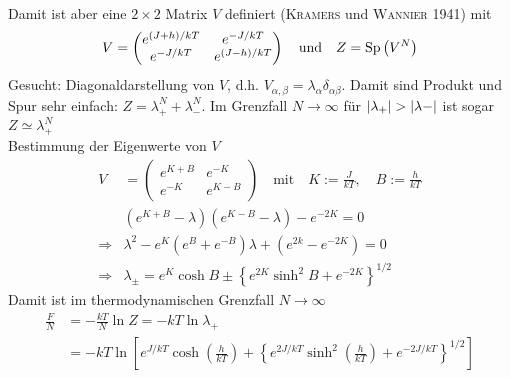 \begin{enumerate}[A)]
\begin{equation}
\begin{split}
        \end{split}
    \end{equation}
    Damit ist aber eine $2\times 2$ Matrix $V$ definiert (\textsc{Kramers} und \textsc{Wannier} 1941) mit
    \begin{equation}
        V =
        \begin{pmatrix}
            e^{(J + h) / k T} & e^{- J / k T} \\
            e^{- J / k T} & e^{(J - h) / k T}
        \end{pmatrix} \quad \text{und} \quad Z = \operatorname{Sp} \left( V^N \right)
    \end{equation}
    Gesucht: Diagonaldarstellung von $V$, d.h. $V_{\alpha, \beta} = \lambda_\alpha \delta_{\alpha \beta}$.
    Damit sind Produkt und Spur sehr einfach: $Z = \lambda_+^N + \lambda_-^N$. Im Grenzfall $N \to \infty$ für $\left| \lambda_+ \right| > \left| \lambda- \right|$
    ist sogar $Z \simeq \lambda_+^N$ \\
    Bestimmung der Eigenwerte von $V$
    \begin{equation}
        \begin{split}
            V &=
            \begin{pmatrix}
                e^{K + B} & e^{-K} \\
                e^{-K} & e^{K - B}
            \end{pmatrix} \quad \text{mit} \quad K := \frac{J}{k T}, \quad B := \frac{h}{k T} \\
            & \left( e^{K + B} - \lambda \right) \left( e^{K - B} - \lambda \right) - e^{-2K} = 0 \\
            \Rightarrow &  \lambda^2 - e^K \left( e^B + e^{-B} \right) \lambda + \left( e^{2k} - e^{-2K} \right) = 0 \\
            \Rightarrow & \lambda_\pm = e^K \cosh B \pm \left\{ e^{2K} \sinh^2 B + e^{-2K} \right\}^{1/2}
        \end{split}
    \end{equation}
    Damit ist im thermodynamischen Grenzfall $N \to \infty$
    \begin{equation}
        \begin{split}
            \frac{F}{N} &= - \frac{k T}{N} \ln Z = - k T \ln \lambda_+ \\
            &= - k T \ln \left[ e^{J / k T} \cosh \left( \frac{h}{k T} \right) + \left\{ e^{2 J / k T} \sinh^2 \left( \frac{h}{k T} \right) + e^{-2J/kT} \right\}^{1/2} \right]
        \end{split}
    \end{equation}

\end{enumerate}
